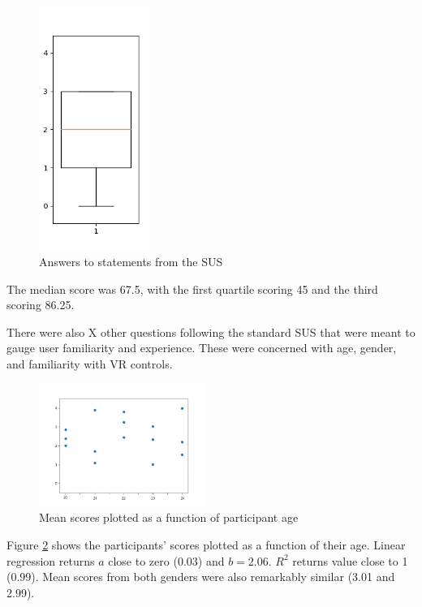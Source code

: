 \begin{figure}[h]
\includegraphics[width=0.32\textwidth]{10.png}
\caption{Answers to statements from the SUS}
\label{fig:one}
\end{figure}

The median score was 67.5, with the first quartile scoring 45 and the third scoring 86.25. %

There were also X other questions following the standard SUS that were meant to gauge user familiarity and experience. These were concerned with age, gender, and familiarity with VR controls. 

\begin{figure}[H]
\centering
\includegraphics[width = 0.48\textwidth]{age.png}
\caption{Mean scores plotted as a function of participant age}
\label{fig:age}
\end{figure}

Figure \ref{fig:age} shows the participants' scores plotted as a function of their age. Linear regression returns $a$ close to zero ($0.03$) and $b = 2.06$. $R^2$ returns value close to 1 ($0.99$). Mean scores from both genders were also remarkably similar (3.01 and 2.99). 

